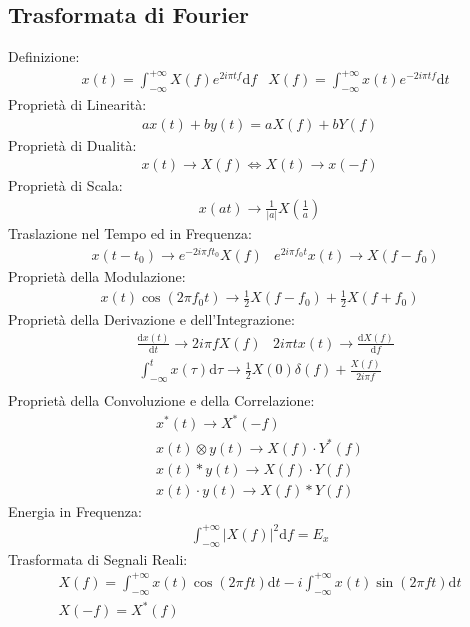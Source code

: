 \documentclass{article}
\newcommand{\df}{\mathrm{d}}
\newcommand{\intinf}{\displaystyle\int_{-\infty}^{+\infty}}
\begin{document}
\subsection*{Trasformata di Fourier}
Definizione:
\begin{align*}
    &x(t)=\intinf X(f)e^{2i\pi tf}\df f
    &X(f)=\intinf x(t)e^{-2i\pi tf}\df t
\end{align*}
Proprietà di Linearità:
\begin{gather*}
    ax(t)+by(t)=aX(f)+bY(f)
\end{gather*}
Proprietà di Dualità:
\begin{gather*}
    x(t)\to X(f)\iff X(t)\to x(-f)
\end{gather*}
Proprietà di Scala:
\begin{gather*}
    x(at)\to\displaystyle\frac{1}{|a|}X\left(\frac{1}{a}\right)
\end{gather*}
Traslazione nel Tempo ed in Frequenza:
\begin{align*}
    &x(t-t_0)\to e^{-2i\pi ft_0}X(f)
    &e^{2i\pi f_0t}x(t)\to X(f-f_0)
\end{align*}
Proprietà della Modulazione:
\begin{gather*}
    x(t)\cos(2\pi f_0t)\to\displaystyle\frac{1}{2}X(f-f_0)+\frac{1}{2}X(f+f_0)
\end{gather*}
Proprietà della Derivazione e dell'Integrazione:
\begin{align*}
    &\displaystyle\frac{\df x(t)}{\df t}\to 2i\pi fX(f)
    &2i\pi tx(t)\to\displaystyle\frac{\df X(f)}{\df f}
\end{align*}
\begin{gather*}
    \displaystyle\int_{-\infty}^{t}x(\tau)\df \tau\to\frac{1}{2}X(0)\delta(f)+\frac{X(f)}{2i\pi f}\\
\end{gather*}
Proprietà della Convoluzione e della Correlazione:
\begin{gather*}
    x^*(t)\to X^*(-f)\\
    x(t)\otimes y(t)\to X(f)\cdot Y^*(f)\\
    x(t)*y(t)\to X(f)\cdot Y(f)\\
    x(t)\cdot y(t)\to X(f)*Y(f)
\end{gather*}
Energia in Frequenza:
\begin{gather*}
    \intinf |X(f)|^2\df f=E_x
\end{gather*}
Trasformata di Segnali Reali:
\begin{gather*}
    X(f)=\intinf x(t)\cos(2\pi ft)\df t-i\intinf x(t)\sin(2\pi ft)\df t\\
    X(-f)=X^*(f)
\end{gather*}
\end{document}
